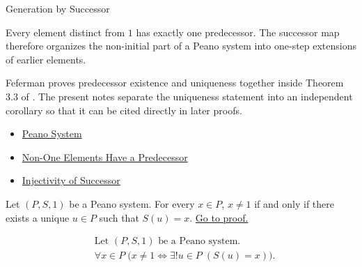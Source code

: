 \begin{topicbox}{Generation by Successor}
\begin{remark*}[Interpretation]
Every element distinct from $1$ has exactly one predecessor. The successor map
therefore organizes the non-initial part of a Peano system into one-step
extensions of earlier elements.
\end{remark*}

\begin{remark*}
Feferman proves predecessor existence and uniqueness together inside Theorem
3.3 of \citet{FefermanNumberSystems1964}. The present notes separate the
uniqueness statement into an independent corollary so that it can be cited
directly in later proofs.
\end{remark*}

\begin{remark*}[Dependencies]
\begin{itemize}
  \item \hyperref[def:peano-system]{Peano System}
  \item \hyperref[cor:non-one-elements-have-a-predecessor]{Non-One Elements Have a Predecessor}
  \item \hyperref[ax:peano-successor-injective]{Injectivity of Successor}
\end{itemize}
\end{remark*}

\begin{tcolorbox}[colback=corbox, colframe=corborder, arc=2pt,
  left=6pt, right=6pt, top=4pt, bottom=4pt,
  title={\small\textbf{Corollary (Unique Predecessor Characterization Away from \texorpdfstring{$1$}{1})}} ,
  fonttitle=\small\bfseries]
\begin{corollary}
\label{cor:unique-predecessor-characterization-away-from-one}
Let $(P,S,1)$ be a Peano system. For every $x \in P$, $x \neq 1$ if and
only if there exists a unique $u \in P$ such that $S(u)=x$.
\hyperref[prf:unique-predecessor-characterization-away-from-one]{Go to proof.}
\end{corollary}
\end{tcolorbox}

\begin{remark*}
\[
\begin{aligned}
&\text{Let } (P,S,1) \text{ be a Peano system.}\\
&\forall x \in P\;\bigl(x\neq 1 \Longleftrightarrow
\exists! u \in P\;(S(u)=x)\bigr).
\end{aligned}
\]
\end{remark*}


\end{topicbox}
